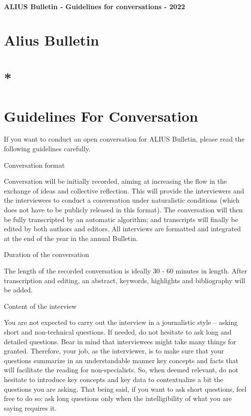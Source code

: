 \documentclass[11pt]{article}
\begin{document}
{\LARGE\bfseries ALIUS Bulletin - Guidelines for conversations - 2022\par}
\vspace{1em}
\section*{Alius Bulletin}
\section*{*}
\section*{Guidelines For Conversation}
If you want to conduct an open conversation for ALIUS Bulletin, please read the following guidelines carefully.\par

Conversation format\par

Conversation will be initially recorded, aiming at increasing the flow in the exchange of ideas and collective reflection. This will provide the interviewers and the interviewees to conduct a conversation under naturalistic conditions (which does not have to be publicly released in this format). The conversation will then be fully transcripted by an automatic algorithm; and transcripts will finally be edited by both authors and editors. All interviews are formatted and integrated at the end of the year in the annual Bulletin.\par

Duration of the conversation\par

The length of the recorded conversation is ideally 30 - 60 minutes in length. After transcription and editing, an abstract, keywords, highlights and bibliography will be added.\par

Content of the interview\par

You are not expected to carry out the interview in a journalistic style – asking short and non-technical questions. If needed, do not hesitate to ask long and detailed questions. Bear in mind that interviewees might take many things for granted. Therefore, your job, as the interviewer, is to make sure that your questions summarize in an understandable manner key concepts and facts that will facilitate the reading for non-specialists. So, when deemed relevant, do not hesitate to introduce key concepts and key data to contextualize a bit the questions you are asking. That being said, if you want to ask short questions, feel free to do so: ask long questions only when the intelligibility of what you are saying requires it.\par
\end{document}
